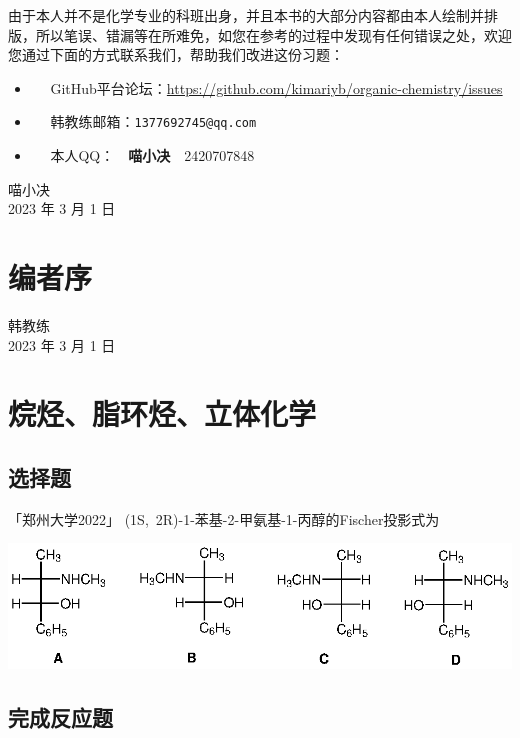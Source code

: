 \documentclass[
  10pt,
  twoside,
  openany,
  b5paper, %
  colorscheme = basic, %
]{qyxf-book}
\begin{document}
由于本人并不是化学专业的科班出身，并且本书的大部分内容都由本人绘制并排版，所以笔误、错漏等在所难免，如您在参考的过程中发现有任何错误之处，欢迎您通过下面的方式联系我们，帮助我们改进这份习题：
\begin{itemize}
	\item \faGithub ~~ GitHub平台论坛：\url{https://github.com/kimariyb/organic-chemistry/issues}
	\item \faEnvelopeOpen ~~ 韩教练邮箱：\texttt{1377692745@qq.com}
	\item \faQq ~~ 
	本人QQ：~~\textbf{喵小决}~~2420707848
\end{itemize}

\begin{flushright}
	喵小决\\
	2023 年 3 月 1 日
\end{flushright}

\chapter*{编者序}



\begin{flushright}
	韩教练\\
	2023 年 3 月 1 日
\end{flushright}

\cleardoublepage


\tableofcontents

\chapter{烷烃、脂环烃、立体化学}

\section{选择题}

 「郑州大学2022」 (1S,\ 2R)-1-苯基-2-甲氨基-1-丙醇的Fischer投影式为
\begin{scheme}[ht]
	\includegraphics{chapter1/01/001.eps}
\end{scheme}

\section{完成反应题}
\end{document}
